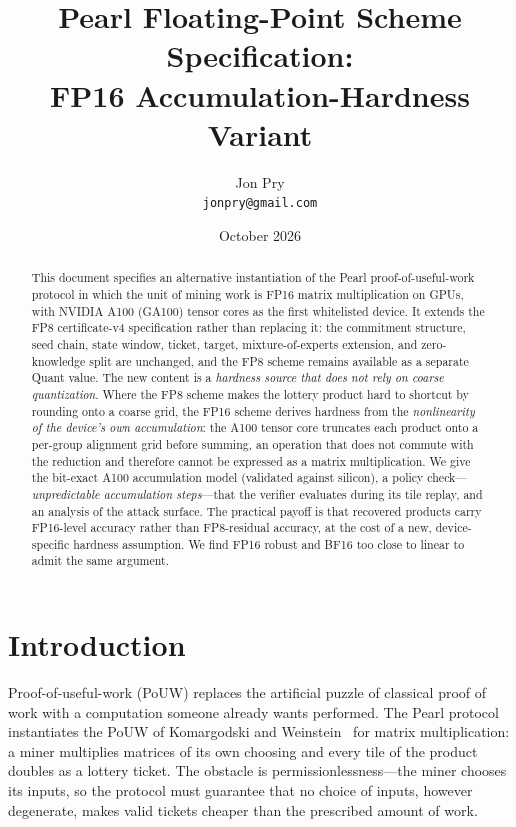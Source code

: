 \documentclass[11pt]{article}
\title{\textbf{Pearl Floating-Point Scheme Specification:\\ FP16 Accumulation-Hardness Variant}}
\author{Jon Pry\\ \texttt{jonpry@gmail.com}}
\date{October 2026}
\newcommand{\Quant}{\textsf{Quant}}
\newcommand{\FP}[1]{\textsf{FP#1}}
\begin{document}
\maketitle

\begin{abstract}
This document specifies an alternative instantiation of the Pearl proof-of-useful-work
protocol in which the unit of mining work is \FP{16} matrix multiplication on GPUs, with
NVIDIA A100 (GA100) tensor cores as the first whitelisted device. It extends the \FP{8}
certificate-v4 specification rather than replacing it: the commitment structure, seed chain,
state window, ticket, target, mixture-of-experts extension, and zero-knowledge split are
unchanged, and the \FP{8} scheme remains available as a separate \Quant{} value. The new
content is a \emph{hardness source that does not rely on coarse quantization}. Where the
\FP{8} scheme makes the lottery product hard to shortcut by rounding onto a coarse grid, the
\FP{16} scheme derives hardness from the \emph{nonlinearity of the device's own accumulation}:
the A100 tensor core truncates each product onto a per-group alignment grid before summing,
an operation that does not commute with the reduction and therefore cannot be expressed as a
matrix multiplication. We give the bit-exact A100 accumulation model (validated against
silicon), a policy check---\emph{unpredictable accumulation steps}---that the verifier
evaluates during its tile replay, and an analysis of the attack surface. The practical payoff
is that recovered products carry \FP{16}-level accuracy rather than \FP{8}-residual accuracy,
at the cost of a new, device-specific hardness assumption. We find \FP{16} robust and
\textsf{BF16} too close to linear to admit the same argument.
\end{abstract}

\tableofcontents

\section{Introduction}\label{sec:intro}

Proof-of-useful-work (PoUW) replaces the artificial puzzle of classical proof of work with a
computation someone already wants performed. The Pearl protocol instantiates the PoUW of
Komargodski and Weinstein~\cite{KW25} for matrix multiplication: a miner multiplies matrices
of its own choosing and every tile of the product doubles as a lottery ticket. The obstacle
is permissionlessness---the miner chooses its inputs, so the protocol must guarantee that no
choice of inputs, however degenerate, makes valid tickets cheaper than the prescribed amount
of work.
\end{document}

